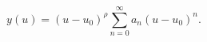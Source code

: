 \begin{equation}
\label{eqansatz}
y(u) = (u-u_0)^\rho \sum\limits_{n=0}^\infty a_n (u-u_0)^n.
\end{equation}

